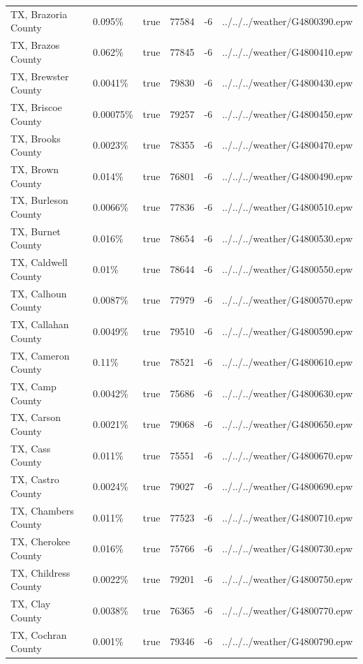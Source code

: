 \begin{longtable}[]{@{}llllll@{}}
TX, Brazoria County & 0.095\% & true & 77584 & -6 &
../../../weather/G4800390.epw \\
TX, Brazos County & 0.062\% & true & 77845 & -6 &
../../../weather/G4800410.epw \\
TX, Brewster County & 0.0041\% & true & 79830 & -6 &
../../../weather/G4800430.epw \\
TX, Briscoe County & 0.00075\% & true & 79257 & -6 &
../../../weather/G4800450.epw \\
TX, Brooks County & 0.0023\% & true & 78355 & -6 &
../../../weather/G4800470.epw \\
TX, Brown County & 0.014\% & true & 76801 & -6 &
../../../weather/G4800490.epw \\
TX, Burleson County & 0.0066\% & true & 77836 & -6 &
../../../weather/G4800510.epw \\
TX, Burnet County & 0.016\% & true & 78654 & -6 &
../../../weather/G4800530.epw \\
TX, Caldwell County & 0.01\% & true & 78644 & -6 &
../../../weather/G4800550.epw \\
TX, Calhoun County & 0.0087\% & true & 77979 & -6 &
../../../weather/G4800570.epw \\
TX, Callahan County & 0.0049\% & true & 79510 & -6 &
../../../weather/G4800590.epw \\
TX, Cameron County & 0.11\% & true & 78521 & -6 &
../../../weather/G4800610.epw \\
TX, Camp County & 0.0042\% & true & 75686 & -6 &
../../../weather/G4800630.epw \\
TX, Carson County & 0.0021\% & true & 79068 & -6 &
../../../weather/G4800650.epw \\
TX, Cass County & 0.011\% & true & 75551 & -6 &
../../../weather/G4800670.epw \\
TX, Castro County & 0.0024\% & true & 79027 & -6 &
../../../weather/G4800690.epw \\
TX, Chambers County & 0.011\% & true & 77523 & -6 &
../../../weather/G4800710.epw \\
TX, Cherokee County & 0.016\% & true & 75766 & -6 &
../../../weather/G4800730.epw \\
TX, Childress County & 0.0022\% & true & 79201 & -6 &
../../../weather/G4800750.epw \\
TX, Clay County & 0.0038\% & true & 76365 & -6 &
../../../weather/G4800770.epw \\
TX, Cochran County & 0.001\% & true & 79346 & -6 &
../../../weather/G4800790.epw \\

\end{longtable}
